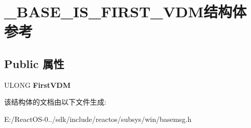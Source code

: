 \hypertarget{struct___b_a_s_e___i_s___f_i_r_s_t___v_d_m}{}\section{\+\_\+\+B\+A\+S\+E\+\_\+\+I\+S\+\_\+\+F\+I\+R\+S\+T\+\_\+\+V\+D\+M结构体 参考}
\label{struct___b_a_s_e___i_s___f_i_r_s_t___v_d_m}
\subsection*{Public 属性}
\begin{DoxyCompactItemize}
\item 
\mbox{\label{struct___b_a_s_e___i_s___f_i_r_s_t___v_d_m_a662a71da8d30a36847b2058bee7dbafd}} 
U\+L\+O\+NG {\bfseries First\+V\+DM}
\end{DoxyCompactItemize}


该结构体的文档由以下文件生成\+:\begin{DoxyCompactItemize}
\item 
E\+:/\+React\+O\+S-\/0../sdk/include/reactos/subsys/win/basemsg.\+h\end{DoxyCompactItemize}
